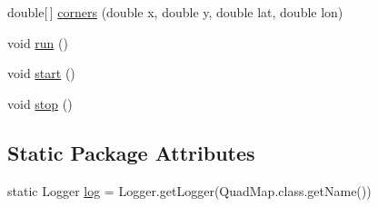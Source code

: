 \begin{DoxyCompactItemize}
\item 
double\mbox{[}$\,$\mbox{]} \hyperlink{classrob_o_s2_1_1mapping_1_1quad_map_1_1_quad_map_a1f25a86b5c1d404f25f9e90c2311b3f2}{corners} (double x, double y, double lat, double lon)
\item 
void \hyperlink{classrob_o_s2_1_1mapping_1_1quad_map_1_1_quad_map_af31a7730380b65079dcc01c03218338a}{run} ()
\item 
void \hyperlink{classrob_o_s2_1_1mapping_1_1quad_map_1_1_quad_map_a7232e1ffc4b48c8ce4a70ef1f965c445}{start} ()
\item 
void \hyperlink{classrob_o_s2_1_1mapping_1_1quad_map_1_1_quad_map_ac60ab9ccdc70b389be6c7e87252f86d1}{stop} ()
\end{DoxyCompactItemize}
\subsection*{Static Package Attributes}
\begin{DoxyCompactItemize}
\item 
static Logger \hyperlink{classrob_o_s2_1_1mapping_1_1quad_map_1_1_quad_map_ac4c01d1f732a042fdfde54e6aa1358f3}{log} = Logger.getLogger(QuadMap.class.getName())
\end{DoxyCompactItemize}
